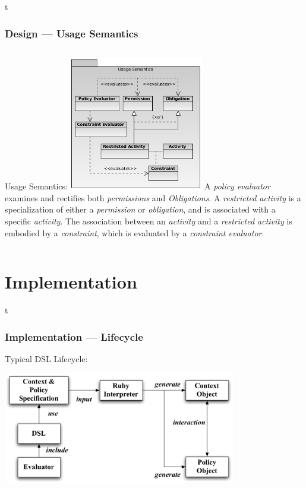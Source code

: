 \documentclass[t, xcolor=dvipsnames, 10pt]{beamer}
\begin{document}
\begin{frame}{t}
\frametitle{Design --- Usage Semantics}
\begin{columns}[t]
Usage Semantics:
\includegraphics[width=2.3in]{usage-semantics}
\pause
A \textit{policy evaluator} examines and rectifies both \textit{permissions} and \textit{Obligations}.
\newline
\newline
\pause
A \textit{restricted activity} is a specialization of either a \textit{permission} or \textit{obligation}, and is associated with a specific \textit{activity}.
\newline
\newline
\pause
The association between an \textit{activity} and a \textit{restricted activity} is embodied by a \textit{constraint}, which is evaluated by a \textit{constraint evaluator}.
\end{columns}
\end{frame}

\section{Implementation}
\begin{frame}{t}
\frametitle{Implementation --- Lifecycle}
Typical DSL Lifecycle: \\
\begin{center}
\includegraphics[width=4in]{DSL-usage}
\end{center}
\end{frame}
\end{document}
